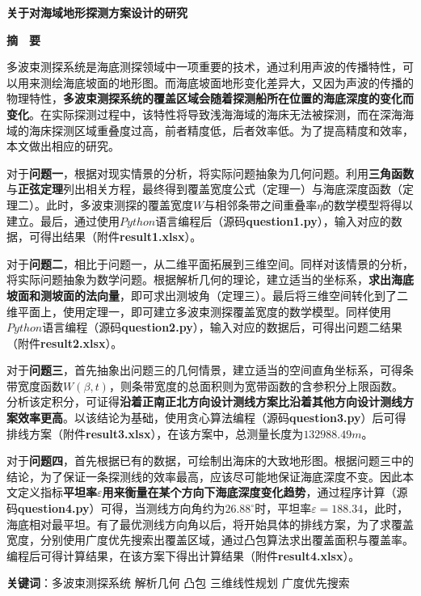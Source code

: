 \thispagestyle{empty}   %

\begin{center}
    \textbf{\fontsize{20}{1.5}关于对海域地形探测方案设计的研究}

    \textbf{摘　要}
\end{center}






多波束测探系统是海底测探领域中一项重要的技术，通过利用声波的传播特性，可以用来测绘海底坡面的地形图。而海底坡面地形变化差异大，又因为声波的传播的物理特性，\textbf{多波束测探系统的覆盖区域会随着探测船所在位置的海底深度的变化而变化}。在实际探测过程中，该特性将导致浅海海域的海床无法被探测，而在深海海域的海床探测区域重叠度过高，前者精度低，后者效率低。为了提高精度和效率，本文做出相应的研究。

对于\textbf{问题一}，根据对现实情景的分析，将实际问题抽象为几何问题。利用\textbf{三角函数}与\textbf{正弦定理}列出相关方程，最终得到覆盖宽度公式（定理一）与海底深度函数（定理二）。此时，多波束测探的覆盖宽度$W$与相邻条带之间重叠率$\eta$的数学模型将得以建立。最后，通过使用$Python$语言编程后（源码\textbf{question1.py}），输入对应的数据，可得出结果（附件\textbf{result1.xlsx}）。

对于\textbf{问题二}，相比于问题一，从二维平面拓展到三维空间。同样对该情景的分析，将实际问题抽象为数学问题。根据解析几何的理论，建立适当的坐标系，\textbf{求出海底坡面和测坡面的法向量}，即可求出测坡角（定理三）。最后将三维空间转化到了二维平面上，使用定理一，即可建立多波束测探覆盖宽度的数学模型。同样使用$Python$语言编程（源码\textbf{question2.py}），输入对应的数据后，可得出问题二结果（附件\textbf{result2.xlsx}）。

对于\textbf{问题三}，首先抽象出问题三的几何情景，建立适当的空间直角坐标系，可得条带宽度函数$W(\beta,t)$，则条带宽度的总面积则为宽带函数的含参积分上限函数。分析该定积分，可证得\textbf{沿着正南正北方向设计测线方案比沿着其他方向设计测线方案效率更高}。以该结论为基础，使用贪心算法编程（源码\textbf{question3.py}）后可得排线方案（附件\textbf{result3.xlsx}），在该方案中，总测量长度为$132988.49m$。

对于\textbf{问题四}，首先根据已有的数据，可绘制出海床的大致地形图。根据问题三中的结论，为了保证一条探测线的效率最高，应该尽可能地保证海底深度不变。因此本文定义指标\textbf{平坦率$\varepsilon$用来衡量在某个方向下海底深度变化趋势}，通过程序计算（源码\textbf{question4.py}）可得，当测线方向角约为$26.88^\circ$时，平坦率$\varepsilon=188.34$，此时，海底相对最平坦。有了最优测线方向角以后，将开始具体的排线方案，为了求覆盖宽度，分别使用广度优先搜索出覆盖区域，通过凸包算法求出覆盖面积与覆盖率。编程后可得计算结果，在该方案下得出计算结果（附件\textbf{result4.xlsx}）。

\quad\newline
\newline
\textbf{关键词}：多波束测探系统 \quad 解析几何 \quad 凸包 \quad 三维线性规划 \quad 广度优先搜索
